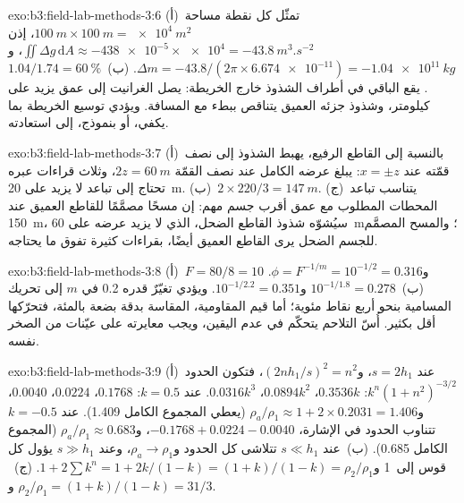 \begin{solution}{exo:b3:field-lab-methods-3:6}
(أ)~تمثّل كل نقطة مساحة $\qty{100}{m}\times\qty{100}{m} =
\qty{e4}{m^2}$، إذن $\iint\Delta g\,\mathrm{d}A \approx
\num{-438e-5}\times\num{e4} = \qty{-43.8}{m^3.s^{-2}}$، و$\Delta m
= -43.8/(2\pi\times\num{6.674e-11}) = \qty{-1.04e11}{kg}$. (ب)~$1.04/1.74
= \qty{60}{\percent}$. يقع الباقي في أطراف الشذوذ خارج
الخريطة: يصل الغرانيت إلى عمق يزيد على كيلومتر،
وشذوذ جزئه العميق يتناقص ببطء مع المسافة. ويؤدي توسيع الخريطة
بما يكفي، أو بنموذج، إلى استعادته.
\end{solution}

\begin{solution}{exo:b3:field-lab-methods-3:7}
(أ)~بالنسبة إلى القاطع الرفيع، يهبط الشذوذ إلى نصف قمّته عند $x = \pm z$:
يبلغ عرضه الكامل عند نصف القمّة $2z = \qty{60}{m}$،
وثلاث قراءات عبره تحتاج إلى تباعد لا يزيد على \qty{20}{m}. (ب)~$2\times
220/3 = \qty{147}{m}$. (ج)~يتناسب تباعد المحطات المطلوب مع
عمق أقرب جسم مهم: إن مسحًا مصمَّمًا للقاطع العميق
عند \qty{150}{m}، سيُشوّه شذوذ القاطع الضحل، الذي
لا يزيد عرضه على \qty{60}{m}؛ والمسح المصمَّم للجسم الضحل يرى
القاطع العميق أيضًا، بقراءات كثيرة تفوق ما يحتاجه.
\end{solution}

\begin{solution}{exo:b3:field-lab-methods-3:8}
(أ)~$F = 80/8 = 10$ و$\phi = F^{-1/m} = 10^{-1/2} = \num{0.316}$.
(ب)~$10^{-1/1.8} = \num{0.278}$ و$10^{-1/2.2} = \num{0.351}$. ويؤدي تغيّرٌ
قدره \num{0.2} في $m$ إلى تحريك المسامية بنحو أربع نقاط مئوية؛
أما قيم المقاومية، المقاسة بدقة بضعة بالمئة، فتحرّكها أقل بكثير. أُسّ
التلاحم يتحكّم في عدم اليقين، ويجب معايرته
على عيّنات من الصخر نفسه.
\end{solution}

\begin{solution}{exo:b3:field-lab-methods-3:9}
(أ)~عند $s = 2h_1$، و$(2nh_1/s)^2 = n^2$، فتكون الحدود $k^n(1 +
n^2)^{-3/2}$: $0.3536k$، $0.0894k^2$، $0.0316k^3$. عند $k = 0.5$:
$\num{0.1768}$، $\num{0.0224}$، $\num{0.0040}$، و$\rho_a/\rho_1 \approx
1 + 2\times0.2031 = \num{1.406}$ (يعطي المجموع الكامل \num{1.409}). عند $k
= -0.5$ تتناوب الحدود في الإشارة، $-0.1768 + 0.0224 - 0.0040$،
و$\rho_a/\rho_1 \approx \num{0.683}$ (المجموع الكامل \num{0.685}). (ب)~عند $s \ll
h_1$ تتلاشى كل الحدود و$\rho_a \to \rho_1$، وعند $s \gg h_1$ يؤول كل
قوس إلى~1 و$1 + 2\sum k^n = 1 + 2k/(1 - k) = (1 + k)/(1 -
k) = \rho_2/\rho_1$. (ج)~$\rho_2/\rho_1 = (1 + k)/(1 - k) = 3$ و$1/3$.
\end{solution}


